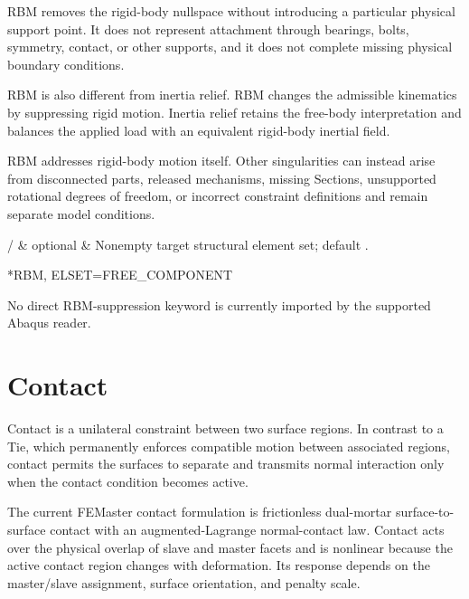 RBM removes the rigid-body nullspace without introducing a particular physical support point. It does not represent attachment through bearings, bolts, symmetry, contact, or other supports, and it does not complete missing physical boundary conditions.

RBM is also different from inertia relief. RBM changes the admissible kinematics by suppressing rigid motion. Inertia relief retains the free-body interpretation and balances the applied load with an equivalent rigid-body inertial field.

RBM addresses rigid-body motion itself. Other singularities can instead arise from disconnected parts, released mechanisms, missing Sections, unsupported rotational degrees of freedom, or incorrect constraint definitions and remain separate model conditions.

\begin{keywordparameters}
 /  & optional & Nonempty target structural element set; default . \\
\end{keywordparameters}

\exampleheading
\begin{dialectexamples}
\begin{femasterdeck}
*RBM, ELSET=FREE_COMPONENT
\end{femasterdeck}
\begin{noabaqus}
No direct RBM-suppression keyword is currently imported by the supported Abaqus reader.
\end{noabaqus}
\end{dialectexamples}

\section{Contact}
\label{sec:contact}

Contact is a unilateral constraint between two surface regions. In contrast to a Tie, which permanently enforces compatible motion between associated regions, contact permits the surfaces to separate and transmits normal interaction only when the contact condition becomes active.

The current FEMaster contact formulation is frictionless dual-mortar surface-to-surface contact with an augmented-Lagrange normal-contact law. Contact acts over the physical overlap of slave and master facets and is nonlinear because the active contact region changes with deformation. Its response depends on the master/slave assignment, surface orientation, and penalty scale.

